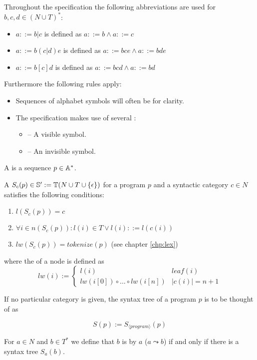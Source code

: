Throughout the specification the following abbreviations are used for $b, c, d  \in (N \cup T)^\ast$:
\begin{itemize}
\item $a   ::=   b | c$ is defined as     $a   ::=   b   \wedge a   ::=   c$
\item $a   ::=   b (c|d) e$ is defined as $a   ::=   bce \wedge a   ::=   bde$
\item $a   ::=   b [c] d$ is defined as   $a   ::=   bcd \wedge a   ::=   bd$
\end{itemize}

Furthermore the following rules apply:

\begin{itemize}
\item Sequences of alphabet symbols will often be  for clarity.
\item The specification makes use of several :
\begin{itemize}
\item \any -- A visible symbol.
\item \invisible -- An invisible symbol.
\end{itemize}
\end{itemize}
\bigskip 

A  is a sequence $p \in \mathbb{A}^\ast$.

A  $S_c(p) \in \mathbb{S}' := \mathbb{T}(N \cup T \cup \{ \epsilon \})$ for a program $p$ and a syntactic category $c \in N$  satisfies the following conditions:
\begin{enumerate}
\item $l(S_c(p)) = c$
\item $\forall i \in n(S_c(p)) : l(i) \in T \vee l(i) ::= l(c(i))$
\item $lw(S_c(p)) = tokenize(p)$ (see chapter \ref{chp:lex})
\end{enumerate}

where the  of a node is defined as \[ lw(i)  :=  \begin{cases} l(i) & leaf(i) \\ lw(i[0]) \circ ... \circ lw(i[n]) & \vert c(i) \vert = n + 1\end{cases}\]

If no particular category is given, the syntax tree of a program $p$ is to be thought of as

\[S(p) := S_{\langle program \rangle} (p)\]

For $a \in N$ and $b \in T^\ast$ we define that $b$ is  by $a$ ($a \leadsto b $) if and only if there is a syntax tree $S_a(b)$.


